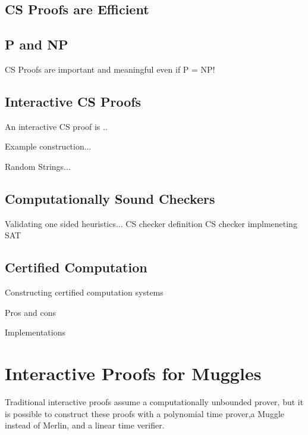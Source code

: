 \documentclass{article}
\begin{document}
\subsection{CS Proofs are Efficient}

\subsection{P and NP}
CS Proofs are important and meaningful even if P = NP!

\subsection{Interactive CS Proofs}

 An interactive CS proof is ..

  Example construction...

Random Strings...

\subsection {Computationally Sound Checkers}

Validating one sided heuristics...
CS checker definition
CS checker implmeneting SAT

\subsection {Certified Computation}

Constructing certified computation systems

Pros and cons

Implementations


\section{Interactive Proofs for Muggles}

Traditional interactive proofs assume a computationally unbounded prover, but it is possible to construct these proofs with a polynomial time prover,a Muggle instead of Merlin, and a linear time verifier.
\end{document}
